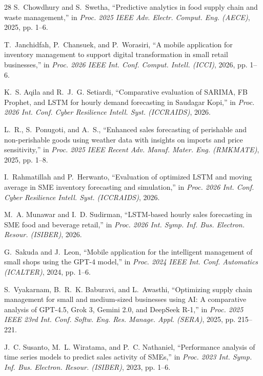 \documentclass[conference]{IEEEtran}
\begin{document}
\begin{thebibliography}{28}
S.~Chowdhury and S.~Swetha, ``Predictive analytics in food supply chain and waste management,'' in \emph{Proc. 2025 IEEE Adv. Electr. Comput. Eng. (AECE)}, 2025, pp. 1--6.

T.~Janchidfah, P.~Chansuek, and P.~Worasiri, ``A mobile application for inventory management to support digital transformation in small retail businesses,'' in \emph{Proc. 2026 IEEE Int. Conf. Comput. Intell. (ICCI)}, 2026, pp. 1--6.

K.~S. Aqila and R.~J.~G. Setiardi, ``Comparative evaluation of SARIMA, FB Prophet, and LSTM for hourly demand forecasting in Saudagar Kopi,'' in \emph{Proc. 2026 Int. Conf. Cyber Resilience Intell. Syst. (ICCRAIDS)}, 2026.

L.~R., S.~Ponugoti, and A.~S., ``Enhanced sales forecasting of perishable and non-perishable goods using weather data with insights on imports and price sensitivity,'' in \emph{Proc. 2025 IEEE Recent Adv. Manuf. Mater. Eng. (RMKMATE)}, 2025, pp. 1--8.

I.~Rahmatillah and P.~Herwanto, ``Evaluation of optimized LSTM and moving average in SME inventory forecasting and simulation,'' in \emph{Proc. 2026 Int. Conf. Cyber Resilience Intell. Syst. (ICCRAIDS)}, 2026.

M.~A. Munawar and I.~D. Sudirman, ``LSTM-based hourly sales forecasting in SME food and beverage retail,'' in \emph{Proc. 2026 Int. Symp. Inf. Bus. Electron. Resour. (ISIBER)}, 2026.

G.~Sakuda and J.~Leon, ``Mobile application for the intelligent management of small shops using the GPT-4 model,'' in \emph{Proc. 2024 IEEE Int. Conf. Automatics (ICALTER)}, 2024, pp. 1--6.

S.~Vyakarnam, B.~R.~K. Baburavi, and L.~Awasthi, ``Optimizing supply chain management for small and medium-sized businesses using AI: A comparative analysis of GPT-4.5, Grok 3, Gemini 2.0, and DeepSeek R-1,'' in \emph{Proc. 2025 IEEE 23rd Int. Conf. Softw. Eng. Res. Manage. Appl. (SERA)}, 2025, pp. 215--221.

J.~C. Susanto, M.~L. Wiratama, and P.~C. Nathaniel, ``Performance analysis of time series models to predict sales activity of SMEs,'' in \emph{Proc. 2023 Int. Symp. Inf. Bus. Electron. Resour. (ISIBER)}, 2023, pp. 1--6.


\end{thebibliography}
\end{document}
